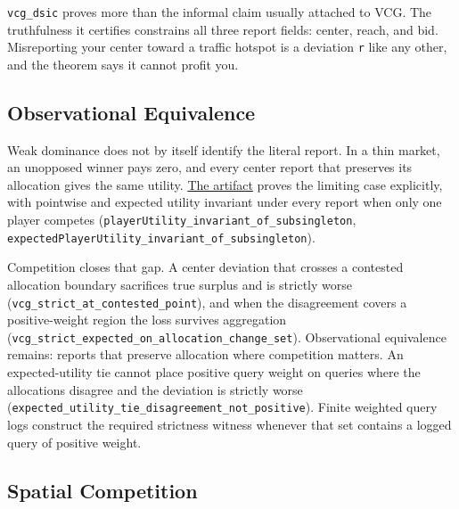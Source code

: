 \texttt{vcg\_dsic} proves more than the informal claim usually attached
to VCG. The truthfulness it certifies constrains all three report
fields: center, reach, and bid. Misreporting your center toward a
traffic hotspot is a deviation \texttt{r\textquotesingle{}} like any
other, and the theorem says it cannot profit you.

\subsection{Observational Equivalence}\label{observational-equivalence}

Weak dominance does not by itself identify the literal report. In a thin
market, an unopposed winner pays zero, and every center report that
preserves its allocation gives the same utility.
\hyperref[formalization]{The artifact} proves the limiting case
explicitly, with pointwise and expected utility invariant under every
report when only one player competes
(\texttt{playerUtility\_invariant\_of\_subsingleton},
\texttt{expectedPlayerUtility\_invariant\_of\_subsingleton}).

Competition closes that gap. A center deviation that crosses a contested
allocation boundary sacrifices true surplus and is strictly worse
(\texttt{vcg\_strict\_at\_contested\_point}), and when the disagreement
covers a positive-weight region the loss survives aggregation
(\texttt{vcg\_strict\_expected\_on\_allocation\_change\_set}).
Observational equivalence remains: reports that preserve allocation
where competition matters. An expected-utility tie cannot place positive
query weight on queries where the allocations disagree and the deviation
is strictly worse
(\texttt{expected\_utility\_tie\_disagreement\_not\_positive}). Finite
weighted query logs construct the required strictness witness whenever
that set contains a logged query of positive weight.

\subsection{Spatial Competition}\label{spatial-competition}

